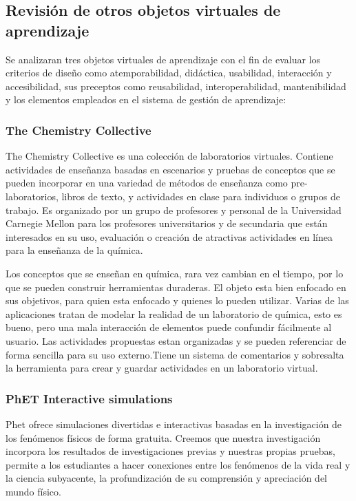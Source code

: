 \documentclass[letterpaper, 11pt, oneside]{article}
\theoremstyle{definition}
\theoremstyle{remark}
\begin{document}
\newpage

\subsection{Revisión de otros objetos virtuales de aprendizaje}

Se analizaran tres objetos virtuales de aprendizaje con el fin de evaluar los criterios de diseño como atemporabilidad, didáctica, usabilidad, interacción y accesibilidad, sus preceptos como reusabilidad, interoperabilidad, mantenibilidad y los elementos empleados en el sistema de gestión de aprendizaje:

\subsubsection{The Chemistry Collective}

The Chemistry Collective es una colección de laboratorios virtuales. Contiene actividades de enseñanza basadas en escenarios y pruebas de conceptos que se pueden incorporar en una variedad de métodos de enseñanza como pre-laboratorios, libros de texto, y actividades en clase para individuos o grupos de trabajo. Es organizado por un grupo de profesores y personal de la Universidad Carnegie Mellon para los profesores universitarios y de secundaria que están interesados en su uso, evaluación o creación de atractivas actividades en línea para la enseñanza de la química.\cite{Chemistry}
 
Los conceptos que se enseñan en química, rara vez cambian en el tiempo, por lo que se pueden construir herramientas duraderas. El objeto esta bien enfocado en sus objetivos, para quien esta enfocado y quienes lo pueden utilizar. Varias de las aplicaciones tratan de modelar la realidad de un laboratorio de química, esto es bueno, pero una mala interacción de elementos puede confundir fácilmente al usuario. Las actividades propuestas estan organizadas y se pueden referenciar de forma sencilla para su uso externo.Tiene un sistema de comentarios y sobresalta la herramienta para crear y guardar actividades en un laboratorio virtual.
\subsubsection{PhET Interactive simulations}

Phet ofrece simulaciones divertidas e interactivas basadas en la investigación de los fenómenos físicos de forma gratuita. Creemos que nuestra investigación incorpora los resultados de investigaciones previas y nuestras propias pruebas, permite a los estudiantes a hacer conexiones entre los fenómenos de la vida real y la ciencia subyacente, la profundización de su comprensión y apreciación del mundo físico.\cite{Colorado}
\end{document}
